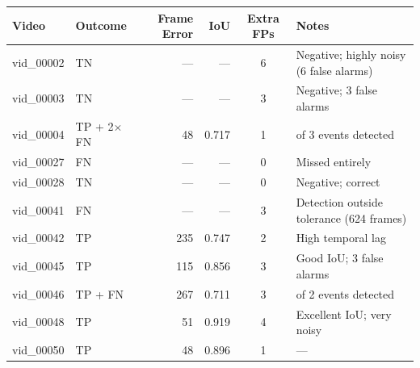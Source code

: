 \begin{table}[!htbp]
	\centering
	\small
	\begin{tabularx}{\textwidth}{l l r r c >{\raggedright\arraybackslash}X}
		\toprule
		\textbf{Video} & \textbf{Outcome} & \textbf{Frame Error} & \textbf{IoU} & \textbf{Extra FPs} & \textbf{Notes}                                 \\
		\midrule
		vid\_00002     & TN               & ---                  & ---          & 6                  & Negative; highly noisy (6 false alarms)        \\
		\addlinespace
		vid\_00003     & TN               & ---                  & ---          & 3                  & Negative; 3 false alarms                       \\
		\addlinespace
		vid\_00004     & TP + 2$\times$FN & 48                   & 0.717        & 1                  & 1 of 3 events detected                         \\
		\addlinespace
		vid\_00027     & FN               & ---                  & ---          & 0                  & Missed entirely                                \\
		\addlinespace
		vid\_00028     & TN               & ---                  & ---          & 0                  & Negative; correct                              \\
		\addlinespace
		vid\_00041     & FN               & ---                  & ---          & 3                  & Detection outside tolerance (624 frames)       \\
		\addlinespace
		vid\_00042     & TP               & 235                  & 0.747        & 2                  & High temporal lag                              \\
		\addlinespace
		vid\_00045     & TP               & 115                  & 0.856        & 3                  & Good IoU; 3 false alarms                       \\
		\addlinespace
		vid\_00046     & TP + FN          & 267                  & 0.711        & 3                  & 1 of 2 events detected                         \\
		\addlinespace
		vid\_00048     & TP               & 51                   & 0.919        & 4                  & Excellent IoU; very noisy                      \\
		\addlinespace
		vid\_00050     & TP               & 48                   & 0.896        & 1                  & ---                                            \\

\end{tabularx}
\end{table}
